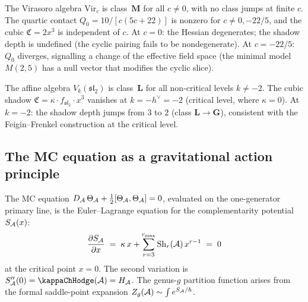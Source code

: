 \begin{example}
The Virasoro algebra $\mathrm{Vir}_c$ is class~$\mathbf{M}$
for all $c \neq 0$, with no class jumps at finite $c$.
The quartic contact $Q_0 = 10/[c(5c+22)]$ is nonzero for
$c \neq 0, -22/5$, and the cubic $\mathfrak{C} = 2x^3$ is
independent of $c$. At $c = 0$: the Hessian degenerates;
the shadow depth is undefined (the cyclic pairing fails to
be nondegenerate). At $c = -22/5$: $Q_0$ diverges, signalling
a change of the effective field space (the minimal model
$M(2,5)$ has a null vector that modifies the cyclic slice).
\end{example}

\begin{example}
The affine algebra $V_k(\mathfrak{sl}_2)$ is class~$\mathbf{L}$
for all non-critical levels $k \neq -2$. The cubic shadow
$\mathfrak{C} = \kappa \cdot f_{\mathfrak{sl}_2}\cdot x^3$
vanishes at $k = -h^\vee = -2$ (critical level, where
$\kappa = 0$). At $k = -2$: the shadow depth jumps from
$3$ to $2$ (class $\mathbf{L} \to \mathbf{G}$), consistent
with the Feigin--Frenkel construction at the critical level.
\end{example}



\subsection{The MC equation as a gravitational action principle}

\begin{theorem}[MC equation = Euler--Lagrange equation]
\ClaimStatusProvedHere
{}
The MC equation $D_{\mathcal{A}}\,\Theta_{\mathcal{A}} +
\frac{1}{2}[\Theta_{\mathcal{A}}, \Theta_{\mathcal{A}}] = 0$,
evaluated on the one-generator primary line, is the
Euler--Lagrange equation for the complementarity potential
$S_{\mathcal{A}}(x)$:
\begin{equation}%
\frac{\partial S_\cA}{\partial x}
\;=\;
\kappa\,x + \sum_{r=3}^{r_{\max}}
\mathrm{Sh}_r(\cA)\,x^{r-1}
\;=\; 0
\end{equation}
at the critical point $x = 0$. The second variation is
$S''_\cA(0) = \kappaChHodge(\cA) = H_\cA$. The genus-$g$
partition function arises from the formal saddle-point
expansion $Z_g(\mathcal{A}) \sim \int e^{S_{\mathcal{A}}/\hbar}$.
\end{theorem}

